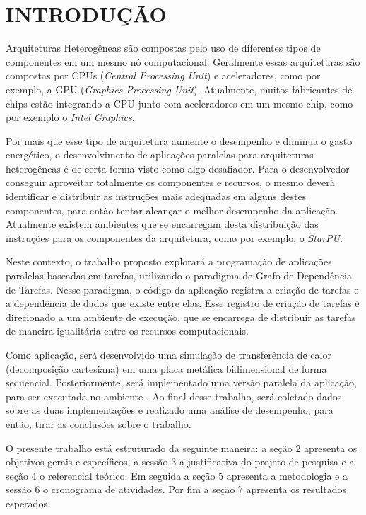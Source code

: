
\chapter{INTRODUÇÃO}
\label{chap:introducao}

Arquiteturas Heterogêneas são compostas pelo uso de diferentes tipos de componentes em um mesmo nó computacional.
Geralmente essas arquiteturas são compostas por CPUs (\textit{Central Processing Unit}) e aceleradores, como por exemplo, a GPU (\textit{Graphics Processing Unit}).
Atualmente, muitos fabricantes de chips estão integrando a CPU junto com aceleradores em um mesmo chip, como por exemplo o \textit{Intel Graphics}. 

Por mais que esse tipo de arquitetura aumente o desempenho e diminua o gasto energético,
o desenvolvimento de aplicações paralelas para arquiteturas heterogêneas é de certa forma visto como algo desafiador.
Para o desenvolvedor conseguir aproveitar totalmente os componentes e recursos, o mesmo deverá identificar e distribuir as instruções mais adequadas em alguns destes componentes,
para então tentar alcançar o melhor desempenho da aplicação.
Atualmente existem ambientes que se encarregam desta distribuição das instruções para os componentes da arquitetura, como por exemplo, o \textit{StarPU}.

Neste contexto, o trabalho proposto explorará a programação de aplicações paralelas baseadas em tarefas, utilizando o paradigma de Grafo de Dependência de Tarefas.
Nesse paradigma, o código da aplicação registra a criação de tarefas e a dependência de dados que existe entre elas.
Esse registro de criação de tarefas é direcionado a um ambiente de execução, que se encarrega de distribuir as tarefas de maneira igualitária entre os recursos computacionais.

Como aplicação, será desenvolvido uma simulação de transferência de calor (decomposição cartesiana) em uma placa metálica bidimensional de forma sequencial.
Posteriormente, será implementado uma versão paralela da aplicação, para ser executada no ambiente .
Ao final desse trabalho, será coletado dados sobre as duas implementações e realizado uma análise de desempenho, para então, tirar as conclusões sobre o trabalho.

O presente trabalho está estruturado da seguinte maneira: a seção 2 apresenta os objetivos gerais e específicos, a sessão 3 a justificativa do projeto de pesquisa e a seção 4
o referencial teórico.
Em seguida a seção 5 apresenta a metodologia e a sessão 6 o cronograma de atividades.
Por fim a seção 7 apresenta os resultados esperados.